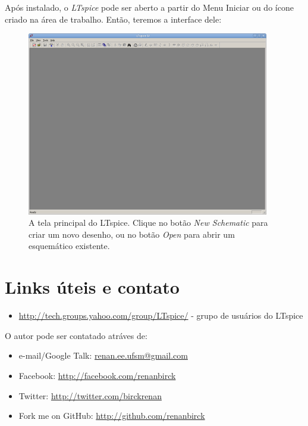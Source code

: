 \documentclass[]{book}
\begin{document}
Após instalado, o \textit{LTspice} pode ser aberto a partir do Menu Iniciar ou do ícone criado na área de trabalho. Então, teremos a interface dele:

\begin{figure}[htb]
\center \includegraphics[width=400px]{imagens/ltspice_janela_principal}
\caption{A tela principal do LTspice. Clique no botão \textit{New Schematic} para criar um novo desenho, ou no botão \textit{Open} para abrir um esquemático existente.}
\end{figure}

\chapter{Links úteis e contato}
\begin{itemize}
\item \url{http://tech.groups.yahoo.com/group/LTspice/} - grupo de usuários do LTspice
\end{itemize}

O autor pode ser contatado atráves de:

\begin{itemize}
\item e-mail/Google Talk: \url{renan.ee.ufsm@gmail.com}
\item Facebook: \url{http://facebook.com/renanbirck}
\item Twitter: \url{http://twitter.com/birckrenan}
\item Fork me on GitHub: \url{http://github.com/renanbirck}
\end{itemize}



\end{document}
